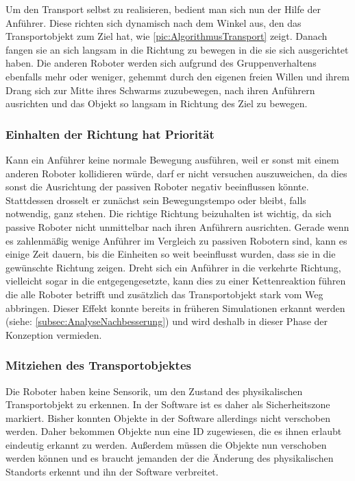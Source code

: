Um den Transport selbst zu realisieren, bedient man sich nun der Hilfe der Anführer. Diese richten sich dynamisch nach dem Winkel aus, den das Transportobjekt zum Ziel hat, wie \autoref{pic:AlgorithmusTransport} zeigt. Danach fangen sie an sich langsam in die Richtung zu bewegen in die sie sich ausgerichtet haben. Die anderen Roboter werden sich aufgrund des Gruppenverhaltens ebenfalls mehr oder weniger, gehemmt durch den eigenen freien Willen und ihrem Drang sich zur Mitte ihres Schwarms zuzubewegen, nach ihren Anführern ausrichten und das Objekt so langsam in Richtung des Ziel zu bewegen.

\subsubsection*{Einhalten der Richtung hat Priorität}

Kann ein Anführer keine normale Bewegung ausführen, weil er sonst mit einem anderen Roboter kollidieren würde, darf er nicht versuchen auszuweichen, da dies sonst die Ausrichtung der passiven Roboter negativ beeinflussen könnte. Stattdessen drosselt er zunächst sein Bewegungstempo oder bleibt, falls notwendig, ganz stehen. Die richtige Richtung beizuhalten ist wichtig, da sich passive Roboter nicht unmittelbar nach ihren Anführern ausrichten. Gerade wenn es zahlenmäßig wenige Anführer im Vergleich zu passiven Robotern sind, kann es einige Zeit dauern, bis die Einheiten so weit beeinflusst wurden, dass sie in die gewünschte Richtung zeigen. Dreht sich ein Anführer in die verkehrte Richtung, vielleicht sogar in die entgegengesetzte, kann dies zu einer Kettenreaktion führen die alle Roboter betrifft und zusätzlich das Transportobjekt stark vom Weg abbringen. Dieser Effekt konnte bereits in früheren Simulationen erkannt werden (siehe: \autoref{subsec:AnalyseNachbesserung}) und wird deshalb in dieser Phase der Konzeption vermieden.

\subsubsection*{Mitziehen des Transportobjektes}

Die Roboter haben keine Sensorik, um den Zustand des physikalischen Transportobjekt zu erkennen. In der Software ist es daher als Sicherheitszone markiert. Bisher konnten Objekte in der Software allerdings nicht verschoben werden. Daher bekommen Objekte nun eine ID zugewiesen, die es ihnen erlaubt eindeutig erkannt zu werden. Außerdem müssen die Objekte nun verschoben werden können und es braucht jemanden der die Änderung des physikalischen Standorts erkennt und ihn der Software verbreitet.

